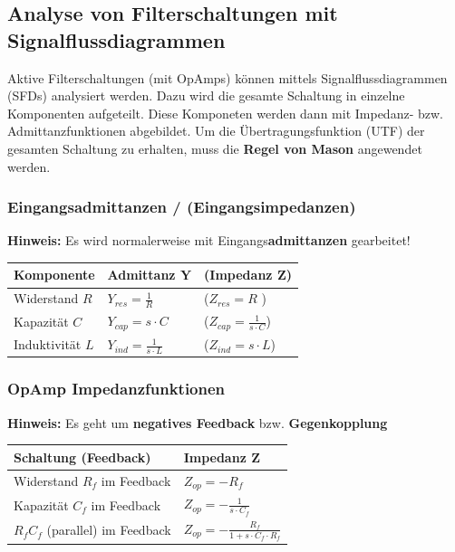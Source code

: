 \subsection{Analyse von Filterschaltungen mit Signalflussdiagrammen}

Aktive Filterschaltungen (mit OpAmps) können mittels Signalflussdiagrammen (SFDs) analysiert werden. Dazu wird die gesamte Schaltung
in einzelne Komponenten aufgeteilt. Diese Komponeten werden dann mit Impedanz- bzw. Admittanzfunktionen abgebildet.
Um die Übertragungsfunktion (UTF) der gesamten Schaltung zu erhalten, muss die \textbf{Regel von Mason} angewendet werden.

\subsubsection{Eingangsadmittanzen / (Eingangsimpedanzen)}

\textbf{Hinweis:} Es wird normalerweise mit Eingangs\textbf{admittanzen} gearbeitet!

\begin{tabular}{lll}
    \textbf{Komponente} & \textbf{Admittanz} $\bm{Y}$       & (\textbf{Impedanz} $\bm{Z}$) \\
    \midrule
    Widerstand $R$      & $Y_{res} = \frac{1}{R}$           & ($Z_{res} = R$  )\\
    Kapazität $C$       & $Y_{cap} = s \cdot C$             & ($Z_{cap} = \frac{1}{s \cdot C}$)\\
    Induktivität $L$    & $Y_{ind} = \frac{1}{s \cdot L}$   & ($Z_{ind} = s \cdot L$)
\end{tabular}


\subsubsection{OpAmp Impedanzfunktionen}

\textbf{Hinweis:} Es geht um \textbf{negatives Feedback} bzw. \textbf{Gegenkopplung}

\begin{tabular}{ll}
    \textbf{Schaltung (Feedback)}       & \textbf{Impedanz} $\bm{Z}$ \\
    \midrule
    Widerstand $R_f$ im Feedback        & $Z_{op} = - R_f$ \\
    Kapazität $C_f$ im Feedback         & $Z_{op} = - \frac{1}{s \cdot C_f}$ \\
    $R_f C_f$ (parallel) im Feedback    & $Z_{op} = - \frac{R_f}{1 + s \cdot C_f \cdot R_f}$
\end{tabular}


